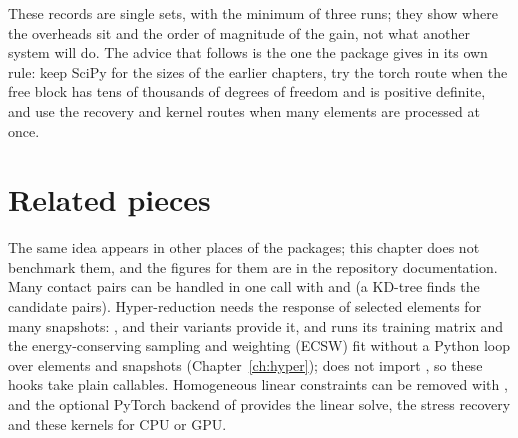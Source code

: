 These records are single sets, with the minimum of three runs; they show where the overheads sit and the order of magnitude of the gain, not what another system will do. The advice that follows is the one the package gives in its own rule: keep SciPy for the sizes of the earlier chapters, try the torch route when the free block has tens of thousands of degrees of freedom and is positive definite, and use the recovery and kernel routes when many elements are processed at once.

\section{Related pieces}\label{sec:bk-related}

The same idea appears in other places of the packages; this chapter does not benchmark them, and the figures for them are in the repository documentation. Many contact pairs can be handled in one call with  and  (a KD-tree finds the candidate pairs). Hyper-reduction needs the response of selected elements for many snapshots: ,  and their  variants provide it, and \rom{} runs its training matrix and the energy-conserving sampling and weighting (ECSW) fit without a Python loop over elements and snapshots (Chapter~\ref{ch:hyper}); \rom{} does not import \fea{}, so these hooks take plain callables. Homogeneous linear constraints can be removed with , and the optional PyTorch backend of  provides the linear solve, the stress recovery and these kernels for CPU or GPU.

